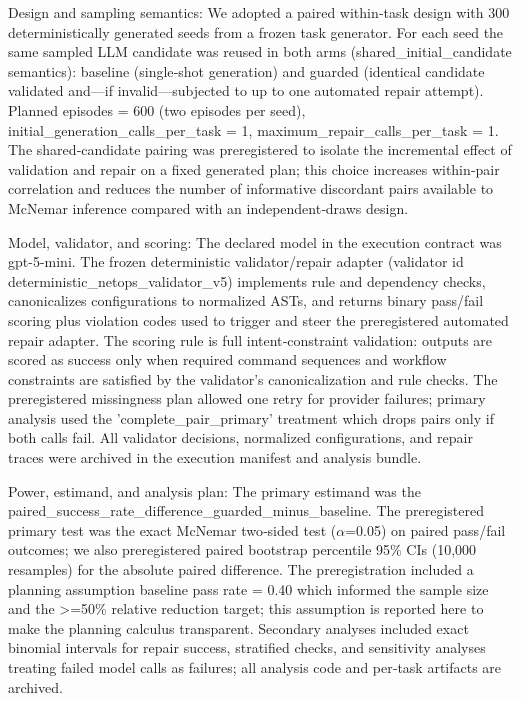 \documentclass[conference]{IEEEtran}
\begin{document}
Design and sampling semantics: We adopted a paired within‑task design with 300 deterministically generated seeds from a frozen task generator. For each seed the same sampled LLM candidate was reused in both arms (shared\_initial\_candidate semantics): baseline (single‑shot generation) and guarded (identical candidate validated and---if invalid---subjected to up to one automated repair attempt). Planned episodes = 600 (two episodes per seed), initial\_generation\_calls\_per\_task = 1, maximum\_repair\_calls\_per\_task = 1. The shared‑candidate pairing was preregistered to isolate the incremental effect of validation and repair on a fixed generated plan; this choice increases within‑pair correlation and reduces the number of informative discordant pairs available to McNemar inference compared with an independent‑draws design.

Model, validator, and scoring: The declared model in the execution contract was gpt-5-mini. The frozen deterministic validator/repair adapter (validator id deterministic\_netops\_validator\_v5) implements rule and dependency checks, canonicalizes configurations to normalized ASTs, and returns binary pass/fail scoring plus violation codes used to trigger and steer the preregistered automated repair adapter. The scoring rule is full intent‑constraint validation: outputs are scored as success only when required command sequences and workflow constraints are satisfied by the validator's canonicalization and rule checks. The preregistered missingness plan allowed one retry for provider failures; primary analysis used the 'complete\_pair\_primary' treatment which drops pairs only if both calls fail. All validator decisions, normalized configurations, and repair traces were archived in the execution manifest and analysis bundle.

Power, estimand, and analysis plan: The primary estimand was the paired\_success\_rate\_difference\_guarded\_minus\_baseline. The preregistered primary test was the exact McNemar two‑sided test (\ensuremath{\alpha}=0.05) on paired pass/fail outcomes; we also preregistered paired bootstrap percentile 95\% CIs (10,000 resamples) for the absolute paired difference. The preregistration included a planning assumption baseline pass rate = 0.40 which informed the sample size and the >=50\% relative reduction target; this assumption is reported here to make the planning calculus transparent. Secondary analyses included exact binomial intervals for repair success, stratified checks, and sensitivity analyses treating failed model calls as failures; all analysis code and per‑task artifacts are archived.
\end{document}
